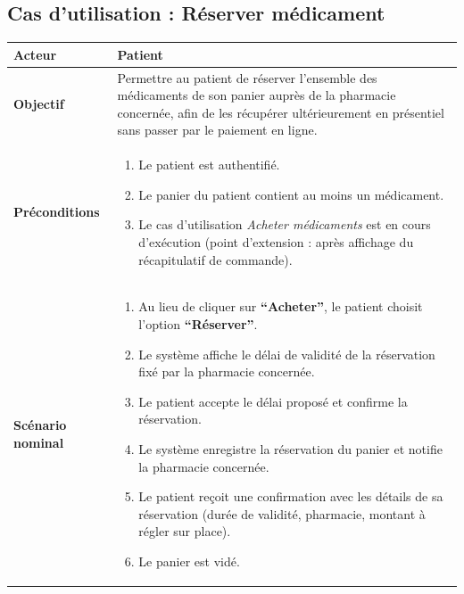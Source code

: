 \documentclass[12pt,a4paper]{report}
\begin{document}
\subsection*{Cas d'utilisation : Réserver médicament}
\begin{table}[H]
    \centering
    \begin{tabular}{|p{4cm}|p{9cm}|}
        \hline
        \textbf{Acteur} & Patient \\
        \hline
        \textbf{Objectif} & Permettre au patient de réserver l'ensemble des médicaments de son panier auprès de la pharmacie concernée, afin de les récupérer ultérieurement en présentiel sans passer par le paiement en ligne. \\
        \hline
        \textbf{Préconditions} &
        \begin{enumerate}
            \item Le patient est authentifié.
            \item Le panier du patient contient au moins un médicament.
            \item Le cas d'utilisation \textit{Acheter médicaments} est en cours d'exécution (point d'extension : après affichage du récapitulatif de commande).
        \end{enumerate} \\
        \hline
        \textbf{Scénario nominal} &
        \begin{enumerate}
            \item Au lieu de cliquer sur \textbf{``Acheter''}, le patient choisit l'option \textbf{``Réserver''}.
            \item Le système affiche le délai de validité de la réservation fixé par la pharmacie concernée.
            \item Le patient accepte le délai proposé et confirme la réservation.
            \item Le système enregistre la réservation du panier et notifie la pharmacie concernée.
            \item Le patient reçoit une confirmation avec les détails de sa réservation (durée de validité, pharmacie, montant à régler sur place).
            \item Le panier est vidé.
        \end{enumerate} \\

\end{tabular}
\end{table}
\end{document}
